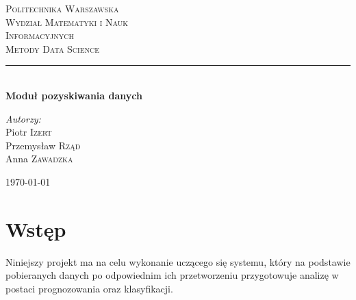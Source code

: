\documentclass{article}
\begin{document}
	
\begin{titlepage}

\newcommand{\HRule}{\rule{\linewidth}{0.5mm}}

\center


\textsc{\LARGE Politechnika Warszawska}\\[10mm]
\textsc{\LARGE Wydział Matematyki i Nauk}\\[4mm]
\textsc{\LARGE Informacyjnych}\\[4cm]
 

\textsc{\Huge Metody Data Science}\\[0.5cm]


\HRule \\[0.4cm]
{ \LARGE \bfseries Moduł pozyskiwania danych}\\[5.0cm]
 
 

\begin{flushright}
\Large \emph{Autorzy:}\\[0.5cm]
Piotr \textsc{Izert}\\
Przemysław \textsc{Rząd}\\
Anna \textsc{Zawadzka}\\
\end{flushright}


\vfill
{\large \today}\\[3cm]

\end{titlepage}
	
\newpage

\section{Wstęp}

Niniejszy projekt ma na celu wykonanie uczącego się systemu, który na podstawie pobieranych danych po odpowiednim ich przetworzeniu przygotowuje analizę w postaci prognozowania oraz  klasyfikacji.\\
\end{document}
